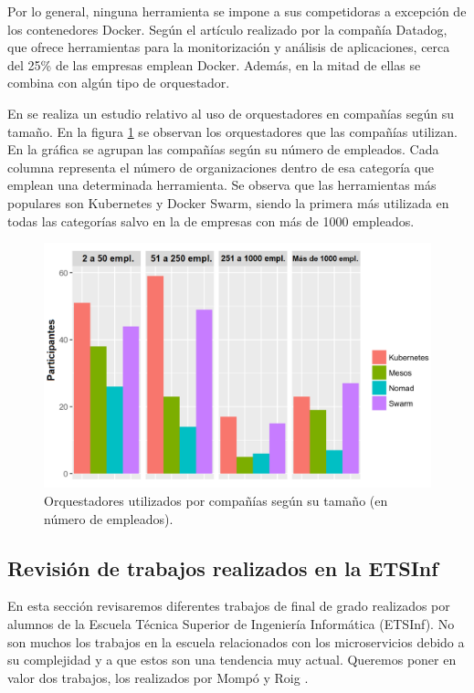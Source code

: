 \documentclass[11pt,spanish,listoffigures]{tfgetsinf}
\begin{document}
Por lo general, ninguna herramienta se impone a sus competidoras a excepción de los contenedores Docker. Según el artículo \cite{Datadog2018} realizado por la compañía Datadog, que ofrece herramientas para la monitorización y análisis de aplicaciones, cerca del 25\% de las empresas emplean Docker. Además, en la mitad de ellas se combina con algún tipo de orquestador. 

En \cite{Ryan2016} se realiza un estudio relativo al uso de orquestadores en compañías según su tamaño. En la figura \ref{fig:Comparativa_Orquestadores_ES} se observan los orquestadores que las compañías utilizan. En la gráfica se agrupan las compañías según su número de empleados. Cada columna representa el número de organizaciones dentro de esa categoría que emplean una determinada herramienta. Se observa que las herramientas más populares son Kubernetes y Docker Swarm, siendo la primera más utilizada en todas las categorías salvo en la de empresas con más de 1000 empleados.

\begin{figure}[h]
\centering
\includegraphics[scale=0.6]{Comparativa_Orquestadores_ES} 
\caption{Orquestadores utilizados por compañías según su tamaño (en número de empleados).}
\label{fig:Comparativa_Orquestadores_ES}
\end{figure}

\subsection{Revisión de trabajos realizados en la ETSInf}

En esta sección revisaremos diferentes trabajos de final de grado realizados por alumnos de la Escuela Técnica Superior de Ingeniería Informática (ETSInf). No son muchos los trabajos en la escuela relacionados con los microservicios debido a su complejidad y a que estos son una tendencia muy actual. Queremos poner en valor dos trabajos, los realizados por Mompó \cite{Mompo2017} y Roig \cite{Roig2017}.
\end{document}
